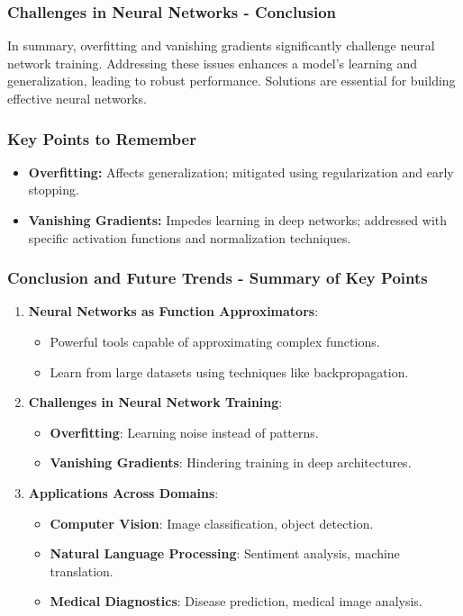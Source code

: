 \documentclass{beamer}
\begin{document}
\begin{frame}[fragile]
    \frametitle{Challenges in Neural Networks - Conclusion}
    In summary, overfitting and vanishing gradients significantly challenge neural network training. Addressing these issues enhances a model's learning and generalization, leading to robust performance. Solutions are essential for building effective neural networks.
\end{frame}

\begin{frame}[fragile]
    \frametitle{Key Points to Remember}
    \begin{itemize}
        \item \textbf{Overfitting:} Affects generalization; mitigated using regularization and early stopping.
        \item \textbf{Vanishing Gradients:} Impedes learning in deep networks; addressed with specific activation functions and normalization techniques.
    \end{itemize}
\end{frame}

\begin{frame}[fragile]
    \frametitle{Conclusion and Future Trends - Summary of Key Points}
    \begin{enumerate}
        \item \textbf{Neural Networks as Function Approximators}:
        \begin{itemize}
            \item Powerful tools capable of approximating complex functions.
            \item Learn from large datasets using techniques like backpropagation.
        \end{itemize}

        \item \textbf{Challenges in Neural Network Training}:
        \begin{itemize}
            \item \textbf{Overfitting}: Learning noise instead of patterns.
            \item \textbf{Vanishing Gradients}: Hindering training in deep architectures.
        \end{itemize}

        \item \textbf{Applications Across Domains}:
        \begin{itemize}
            \item \textbf{Computer Vision}: Image classification, object detection.
            \item \textbf{Natural Language Processing}: Sentiment analysis, machine translation.
            \item \textbf{Medical Diagnostics}: Disease prediction, medical image analysis.
        \end{itemize}
    \end{enumerate}
\end{frame}
\end{document}
